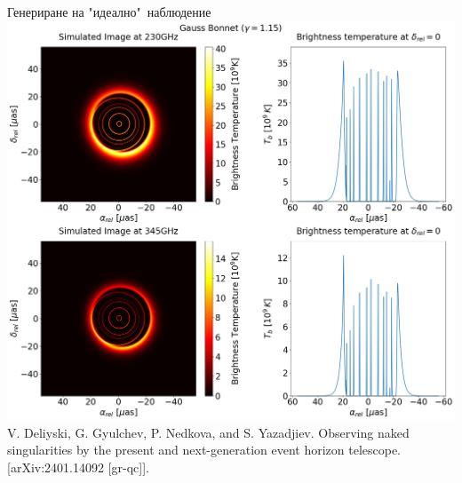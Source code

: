 \documentclass[hyperref={colorlinks,citecolor=blue,linkcolor=blue,urlcolor=blue}]{beamer}
\begin{document}
	\begin{frame}{Генериране на "идеално"$\,$ наблюдение}
		\centering
		\includegraphics[scale = 0.18]{Pre-Defence/Ray_tracer_plot_230_345.png}\\
		
		\tiny V. Deliyski, G. Gyulchev, P. Nedkova, and S. Yazadjiev. Observing naked singularities
		by the present and next-generation event horizon telescope. [arXiv:2401.14092 [gr-qc]].
	\end{frame}
	
\end{document}
